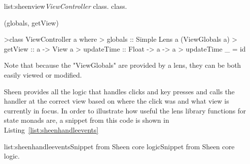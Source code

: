 \vspace{-0.5em}
\begin{listing}{list:sheenview}{\emph{ViewController} class.}{ class.}{}
\end{listing}\vspace{-1.5em}

\functions(globals, getView)
\begin{haskell}

>class ViewController a where
>  globals :: Simple Lens a (ViewGlobals a)
>  getView :: a -> View a
>  updateTime :: Float -> a -> a
>  updateTime _ = id

\end{haskell}
\noindent 
Note that because the "ViewGlobals" are provided by a lens, they can be both easily viewed or modified. 

Sheen provides all the logic that handles clicks and key presses and calls the handler at the correct view based on where the click was and what view is currently in focus. In order to illustrate how useful the lens library functions for state monads are, a snippet from this code is shown in Listing~\ref{list:sheenhandleevents}

\vspace{-0.5em}
\begin{listing}{list:sheenhandleevents}{Snippet from Sheen core logic}{Snippet from Sheen core logic.}{}
\end{listing}\vspace{-1.5em}

